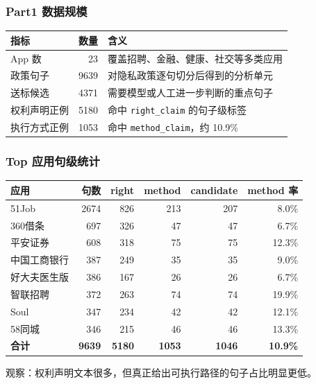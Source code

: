 \documentclass[AutoFakeBold,AutoFakeSlant]{beamer}
\newcommand{\code}[1]{\texttt{#1}}
\begin{document}
\begin{frame}
    \frametitle{Part1 数据规模}
    \small
    \begin{tabularx}{\textwidth}{|l|r|X|}
        \hline
        \textbf{指标} & \textbf{数量} & \textbf{含义} \\
        \hline
        App 数 & 23 & 覆盖招聘、金融、健康、社交等多类应用 \\
        \hline
        政策句子 & 9639 & 对隐私政策逐句切分后得到的分析单元 \\
        \hline
        送标候选 & 4371 & 需要模型或人工进一步判断的重点句子 \\
        \hline
        权利声明正例 & 5180 & 命中 \code{right\_claim} 的句子级标签 \\
        \hline
        执行方式正例 & 1053 & 命中 \code{method\_claim}，约 10.9\% \\
        \hline
    \end{tabularx}
\end{frame}

\begin{frame}
    \frametitle{Top 应用句级统计}
    \tiny
    \begin{tabularx}{\textwidth}{|l|r|r|r|r|r|}
        \toprule
        \textbf{应用} & \textbf{句数} & \textbf{right} & \textbf{method} & \textbf{candidate} & \textbf{method 率} \\
        \midrule
        51Job & 2674 & 826 & 213 & 207 & 8.0\% \\
        360借条 & 697 & 326 & 47 & 47 & 6.7\% \\
        平安证券 & 608 & 318 & 75 & 75 & 12.3\% \\
        中国工商银行 & 387 & 249 & 35 & 35 & 9.0\% \\
        好大夫医生版 & 386 & 167 & 26 & 26 & 6.7\% \\
        智联招聘 & 372 & 263 & 74 & 74 & 19.9\% \\
        Soul & 347 & 234 & 42 & 42 & 12.1\% \\
        58同城 & 346 & 215 & 46 & 46 & 13.3\% \\
        \midrule
        \textbf{合计} & \textbf{9639} & \textbf{5180} & \textbf{1053} & \textbf{1046} & \textbf{10.9\%} \\
        \bottomrule
    \end{tabularx}
    \vspace{0.35em}
    \scriptsize
    观察：权利声明文本很多，但真正给出可执行路径的句子占比明显更低。
\end{frame}
\end{document}
